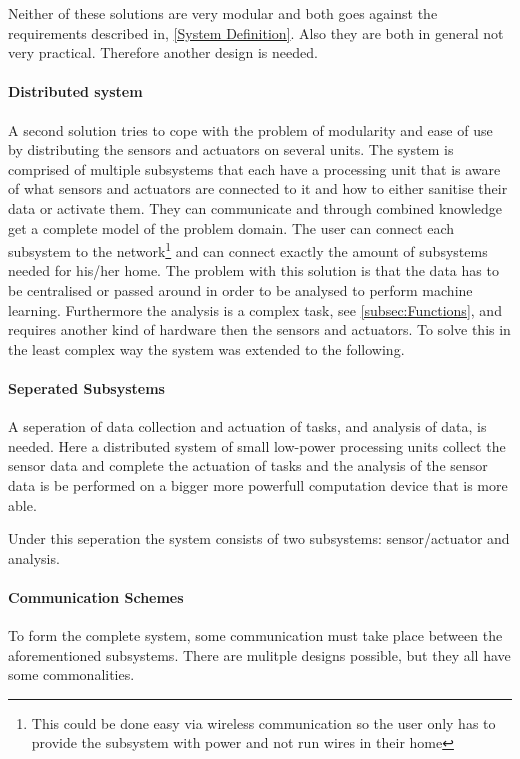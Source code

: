 Neither of these solutions are very modular and both goes against the requirements described in, \cref{System Definition}. Also they are both in general not very practical. Therefore another design is needed.

\paragraph{Distributed system}
A second solution tries to cope with the problem of modularity and ease of use by distributing the sensors and actuators on several units. The system is comprised of multiple subsystems that each have a processing unit that is aware of what sensors and actuators are connected to it and how to either sanitise their data or activate them. They can communicate and through combined knowledge get a complete model of the problem domain. The user can connect each subsystem to the network\footnote{This could be done easy via wireless communication so the user only has to provide the subsystem with power and not run wires in their home} and can connect exactly the amount of subsystems needed for his/her home. The problem with this solution is that the data has to be centralised or passed around in order to be analysed to perform machine learning. Furthermore the analysis is a complex task, see \cref{subsec:Functions}, and requires another kind of hardware then the sensors and actuators. To solve this in the least complex way the system was extended to the following.

\paragraph{Seperated Subsystems} A seperation of data collection and actuation of tasks, and analysis of
data, is needed. Here a distributed system of small low-power processing units collect the sensor data and complete the actuation of tasks and the analysis of the sensor data is be performed on a bigger more powerfull computation device that is more able.

Under this seperation the system consists of two subsystems: sensor/actuator
and analysis. 

\paragraph{Communication Schemes} To form the complete system, some
communication must take place between the aforementioned subsystems. There are
mulitple designs possible, but they all have some commonalities.

